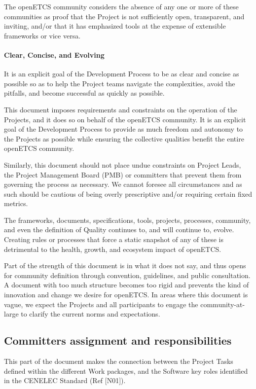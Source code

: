 \documentclass{template/openetcs_article}
\begin{document}
The openETCS community considers the absence of any one or more of these communities as proof that the Project is not sufficiently open, transparent, and inviting, and/or that it has emphasized tools at the expense of extensible frameworks or vice versa.


\paragraph{Clear, Concise, and Evolving}
It is an explicit goal of the Development Process to be as clear and concise as possible so as to help the Project teams navigate the complexities, avoid the pitfalls, and become successful as quickly as possible.

This document imposes requirements and constraints on the operation of the Projects, and it does so on behalf of the openETCS community. It is an explicit goal of the Development Process to provide as much freedom and autonomy to the Projects as possible while ensuring the collective qualities benefit the entire openETCS community.


Similarly, this document should not place undue constraints on Project Leads, the Project Management Board (PMB) or committers that prevent them from governing the process as necessary. We cannot foresee all circumstances and as such should be cautious of being overly prescriptive and/or requiring certain fixed metrics.

The frameworks, documents, specifications, tools, projects, processes, community, and even the definition of Quality continues to, and will continue to, evolve. Creating rules or processes that force a static snapshot of any of these is detrimental to the health, growth, and ecosystem impact of openETCS.

Part of the strength of this document is in what it does not say, and thus opens for community definition through convention, guidelines, and public consultation. A document with too much structure becomes too rigid and prevents the kind of innovation and change we desire for openETCS. In areas where this document is vague, we expect the Projects and all participants to engage the community-at-large to clarify the current norms and expectations.


\subsection{Committers assignment and responsibilities}

This part of the document makes the connection between the Project Tasks defined within the different Work packages, and the Software key roles identified in the CENELEC Standard (Ref [N01]).
\end{document}
